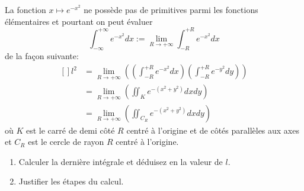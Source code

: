 
\begin{exercice}\label{exoIntMult0010}

La fonction $x \mapsto e^{-x^2}$ ne possède pas de primitives parmi 
les fonctions élémentaires et pourtant on peut évaluer
\begin{equation}
	\int_{-\infty}^{+\infty} e^{-x^2} dx := \lim_{R \to +\infty} \int_{-R}^{+R} e^{-x^2} dx 
\end{equation}
de la fa\c con suivante:
\begin{equation}		\label{EqCalculInteeemoisxcar}
	\begin{aligned}[]
		l^2 &= \lim_{R \to +\infty} \left( (\int_{-R}^{+R} e^{-x^2} dx)( \int_{-R}^{+R} e^{-y^2} dy) \right) \\
		&= \lim_{R \to +\infty} \left( \iint_{K}e^{-(x^2+y^2)} dx dy \right) \\
		&= \lim_{R \to +\infty} \left( \iint_{C_R}e^{-(x^2+y^2)} dx dy \right) 
	\end{aligned}
\end{equation}
où $K$ est le carré de demi côté $R$ centré à l'origine et de côtés parallèles aux axes et $C_R$ est le cercle de rayon $R$ centré à l'origine.
\begin{enumerate}
\item
Calculer la dernière intégrale et déduisez en la valeur de $l$.
\item
Justifier les étapes du calcul.
\end{enumerate}

\end{exercice}
